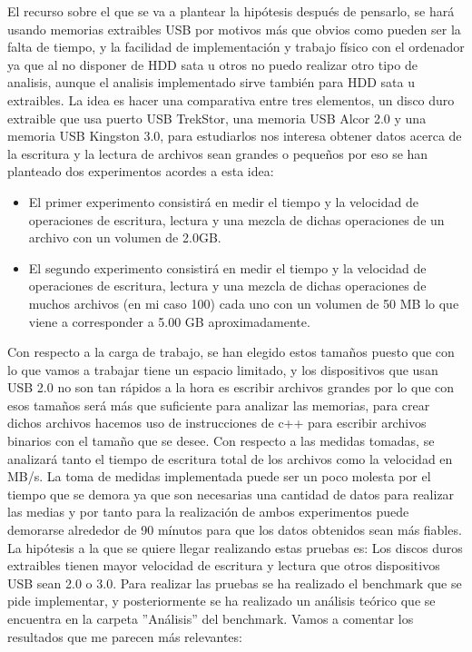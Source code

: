 \documentclass[a4paper, 10pt]{article} %
\begin{document}
El recurso sobre el que se va a plantear la hipótesis después de pensarlo, se hará usando memorias extraibles USB por motivos más que obvios como pueden ser la falta de tiempo, y la facilidad de implementación y trabajo físico con el ordenador ya que al no disponer de HDD sata u otros no puedo realizar otro tipo de analisis, aunque el analisis implementado sirve también para HDD sata u extraibles. La idea es hacer una comparativa entre tres elementos, un disco duro extraible que usa puerto USB TrekStor, una memoria USB Alcor 2.0 y una memoria USB Kingston 3.0, para estudiarlos nos interesa obtener datos acerca de la escritura y la lectura de archivos sean grandes o pequeños por eso se han planteado dos experimentos acordes a esta idea:
\begin{itemize}
\item El primer experimento consistirá en medir el tiempo y la velocidad de operaciones de escritura, lectura y una mezcla de dichas operaciones de un archivo con un volumen de 2.0GB.
\item El segundo experimento consistirá en medir el tiempo y la velocidad de operaciones de escritura, lectura y una mezcla de dichas operaciones de muchos archivos (en mi caso 100) cada uno con un volumen de 50 MB lo que viene a corresponder a 5.00 GB aproximadamente.
\end{itemize}

Con respecto a la carga de trabajo, se han elegido estos tamaños puesto que con lo que vamos a trabajar tiene un espacio limitado, y los dispositivos que usan USB 2.0 no son tan rápidos a la hora es escribir archivos grandes por lo que con esos tamaños será más que suficiente para analizar las memorias, para crear dichos archivos hacemos uso de instrucciones de c++ para escribir archivos binarios con el tamaño que se desee. 
Con respecto a las medidas tomadas, se analizará tanto el tiempo de escritura total de los archivos como la velocidad en MB/s. La toma de medidas implementada puede ser un poco molesta por el tiempo que se demora ya que son necesarias una cantidad de datos para realizar las medias y por tanto para la realización de ambos experimentos puede demorarse alrededor de 90 mínutos para que los datos obtenidos sean más fiables.
La hipótesis a la que se quiere llegar realizando estas pruebas es: Los discos duros extraibles tienen mayor velocidad de escritura y lectura que otros dispositivos USB sean 2.0 o 3.0. Para realizar las pruebas se ha realizado el benchmark que se pide implementar, y posteriormente se ha realizado un análisis teórico que se encuentra en la carpeta ''Análisis'' del benchmark. Vamos a comentar los resultados que me parecen más relevantes:\\
\end{document}
